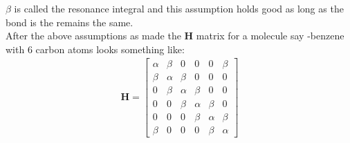 \documentclass[9pt,twocolumn,twoside]{optica}
\begin{document}
$\beta$ is called the resonance integral and this assumption holds good as long as the   bond is the remains the same.\\
After the above assumptions as made the \textbf{H} matrix for a molecule say -benzene with 6 carbon atoms looks something like:
\begin{align}
\textbf{H}=
\begin{bmatrix}
    \alpha & \beta & 0 & 0 & 0 & \beta\\
    \beta & \alpha & \beta & 0 & 0 & 0\\
    0 & \beta & \alpha & \beta & 0 & 0\\
    0 & 0 & \beta & \alpha & \beta & 0\\
    0 & 0 & 0 & \beta & \alpha & \beta\\
    \beta & 0 & 0 & 0 & \beta & \alpha
\end{bmatrix}
 \label{eq:pHmat}
\end{align}
\end{document}
